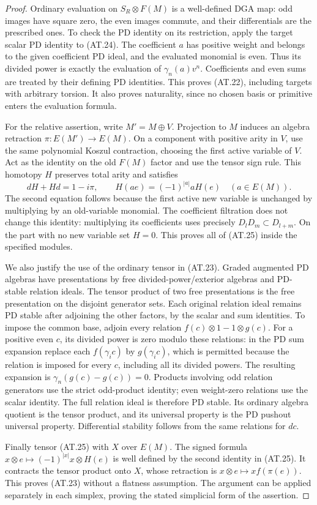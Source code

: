 \begin{proof}
Ordinary evaluation on $S_R\otimes F(M)$ is a
well-defined DGA map: odd images have square zero,
the even images commute, and their differentials
are the prescribed ones. To check the PD identity
on its restriction, apply the target scalar PD
identity to (AT.24). The coefficient $a$ has
positive weight and belongs to the given coefficient
PD ideal, and the evaluated monomial is even.
Thus its divided power is exactly the evaluation
of $\gamma_n(a)v^n$. Coefficients and even sums
are treated by their defining PD identities.
This proves (AT.22), including targets with
arbitrary torsion. It also proves naturality,
since no chosen basis or primitive enters the
evaluation formula.

For the relative assertion, write $M'=M\oplus V$.
Projection to $M$ induces an algebra retraction
$\pi:E(M')\to E(M)$. On a component with positive
arity in $V$, use the same polynomial Koszul
contraction, choosing the first active variable
of $V$. Act as the identity on the old $F(M)$
factor and use the tensor sign rule. This homotopy
$H$ preserves total arity and satisfies
\[
 dH+Hd=1-i\pi,\qquad
 H(ae)=(-1)^{|a|}aH(e)\quad(a\in E(M)).
 \tag{AT.25}
\]
The second equation follows because the first
active new variable is unchanged by multiplying
by an old-variable monomial. The coefficient
filtration does not change this identity:
multiplying its coefficients uses precisely
$D_lD_m\subset D_{l+m}$. On the part with no
new variable set $H=0$. This proves all of
(AT.25) inside the specified modules.

We also justify the use of the ordinary tensor
in (AT.23). Graded augmented PD algebras have
presentations by free divided-power/exterior
algebras and PD-stable relation ideals. The
tensor product of two free presentations is
the free presentation on the disjoint generator
sets. Each original relation ideal remains
PD stable after adjoining the other factors,
by the scalar and sum identities. To impose
the common base, adjoin every relation
$f(c)\otimes1-1\otimes g(c)$. For a positive
even $c$, its divided power is zero modulo
these relations: in the PD sum expansion
replace each $f(\gamma_i c)$ by
$g(\gamma_i c)$, which is permitted because
the relation is imposed for every $c$, including
all its divided powers. The resulting expansion
is $\gamma_n(g(c)-g(c))=0$. Products involving
odd relation generators use the strict
odd-product identity; even weight-zero
relations use the scalar identity. The full
relation ideal is therefore PD stable. Its
ordinary algebra quotient is the tensor
product, and its universal property is the
PD pushout universal property. Differential
stability follows from the same relations
for $dc$.

Finally tensor (AT.25) with $X$ over $E(M)$.
The signed formula $x\otimes e\mapsto
(-1)^{|x|}x\otimes H(e)$ is well defined by
the second identity in (AT.25). It contracts
the tensor product onto $X$, whose retraction
is $x\otimes e\mapsto x f(\pi(e))$.
This proves (AT.23) without a flatness
assumption. The argument can be applied
separately in each simplex, proving the
stated simplicial form of the assertion.
\end{proof}

